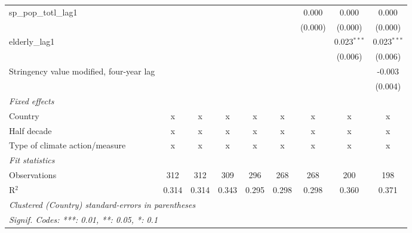 \begin{tabular}{lcccccccc}
   sp\_pop\_totl\_lag1                              &              &         &               &              &               & 0.000        & 0.000         & 0.000\\   
                                                    &              &         &               &              &               & (0.000)      & (0.000)       & (0.000)\\   
   elderly\_lag1                                    &              &         &               &              &               &              & 0.023$^{***}$ & 0.023$^{***}$\\   
                                                    &              &         &               &              &               &              & (0.006)       & (0.006)\\   
   Stringency value modified, four-year lag         &              &         &               &              &               &              &               & -0.003\\   
                                                    &              &         &               &              &               &              &               & (0.004)\\   
   \emph{Fixed effects}\\
   Country                                          & x            & x       & x             & x            & x             & x            & x             & x\\  
   Half decade                                      & x            & x       & x             & x            & x             & x            & x             & x\\  
   Type of climate action/measure                   & x            & x       & x             & x            & x             & x            & x             & x\\  
   \midrule \emph{Fit statistics}\\
   Observations                                     & 312          & 312     & 309           & 296          & 268           & 268          & 200           & 198\\  
   R$^2$                                            & 0.314        & 0.314   & 0.343         & 0.295        & 0.298         & 0.298        & 0.360         & 0.371\\  
   \midrule
   \multicolumn{9}{l}{\emph{Clustered (Country) standard-errors in parentheses}}\\
   \multicolumn{9}{l}{\emph{Signif. Codes: ***: 0.01, **: 0.05, *: 0.1}}\\
\end{tabular}
\par\endgroup


